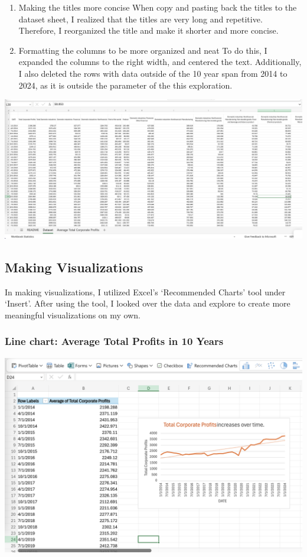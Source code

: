 \documentclass[
  letterpaper,
  DIV=11,
  numbers=noendperiod]{scrreprt}
\begin{document}
\begin{enumerate}
\def\labelenumi{\arabic{enumi}.}
\setcounter{enumi}{1}
\item
  Making the titles more concise When copy and pasting back the titles
  to the dataset sheet, I realized that the titles are very long and
  repetitive. Therefore, I reorganized the title and make it shorter and
  more concise.
\item
  Formatting the columns to be more organized and neat To do this, I
  expanded the columns to the right width, and centered the text.
  Additionally, I also deleted the rows with data outside of the 10 year
  span from 2014 to 2024, as it is outside the parameter of the this
  exploration.
\end{enumerate}

\includegraphics{./Excel_1_Unit/Week1_Janice/Week 1/Week 1 Friday/Cleaned_and_organized_data.png}

\subsection{Making Visualizations}\label{making-visualizations}

In making visualizations, I utilized Excel's `Recommended Charts' tool
under `Insert'. After using the tool, I looked over the data and explore
to create more meaningful visualizations on my own.

\subsubsection{Line chart: Average Total Profits in 10
Years}\label{line-chart-average-total-profits-in-10-years}

\includegraphics{./Excel_1_Unit/Week1_Janice/Week 1/Week 1 Friday/Average_CP.png}
\end{document}
